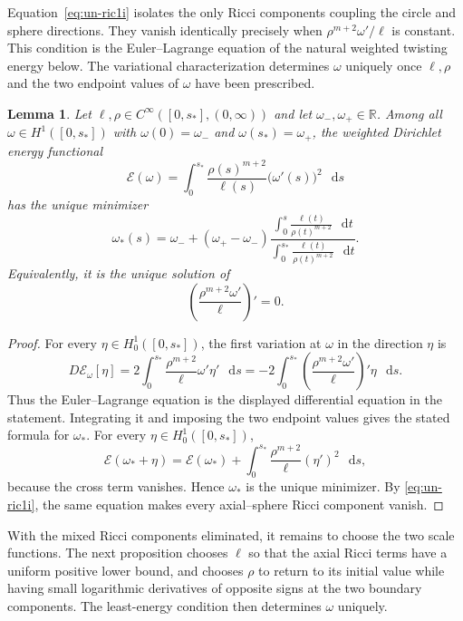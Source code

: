 \documentclass[11pt,reqno]{amsart}
\newtheorem{lemma}[theorem]{Lemma}
\theoremstyle{definition}
\numberwithin{equation}{section}
\newcommand{\dd}{\mathop{}\!\mathrm d}
\begin{document}
Equation~\eqref{eq:un-ric1i} isolates the only Ricci components coupling
the circle and sphere directions.  They vanish identically precisely
when \(\rho^{m+2}\omega'/\ell\) is constant.  This condition is the
Euler--Lagrange equation of the natural weighted twisting energy below.
The variational characterization determines \(\omega\) uniquely once
\(\ell,\rho\) and the two endpoint values of \(\omega\) have been
prescribed.

\begin{lemma}\label{lem:least-energy-twist}
Let $\ell,\rho\in C^\infty([0,s_*],(0,\infty))$ and let
$\omega_-,\omega_+\in\mathbb R$.  Among all
$\omega\in H^1([0,s_*])$ with $\omega(0)=\omega_-$ and
$\omega(s_*)=\omega_+$, the weighted Dirichlet energy functional
\begin{equation}\label{eq:weighted Dirichlet energy}
\mathcal E(\omega)=\int_0^{s_*}
 \frac{\rho(s)^{m+2}}{\ell(s)}\bigl(\omega'(s)\bigr)^2\,\dd s
\end{equation}
has the unique minimizer
\[
 \omega_*(s)=\omega_-+(\omega_+-\omega_-)
 \frac{\displaystyle\int_0^s
        \frac{\ell(t)}{\rho(t)^{m+2}}\,\dd t}
      {\displaystyle\int_0^{s_*}
        \frac{\ell(t)}{\rho(t)^{m+2}}\,\dd t}.
\]
Equivalently, it is the unique solution of
\[
 \left(\frac{\rho^{m+2}\omega'}{\ell}\right)'=0.
\]
\end{lemma}

\begin{proof}
For every $\eta\in H_0^1([0,s_*])$, the first variation at $\omega$ in
the direction $\eta$ is
\[
 D\mathcal E_\omega[\eta]
 =2\int_0^{s_*}\frac{\rho^{m+2}}\ell\omega'\eta'\,\dd s
 =-2\int_0^{s_*}
   \left(\frac{\rho^{m+2}\omega'}\ell\right)'\eta\,\dd s.
\]
Thus the Euler--Lagrange equation is the displayed differential
equation in the statement.  Integrating it and imposing the two
endpoint values gives the stated formula for $\omega_*$.  For every
$\eta\in H_0^1([0,s_*])$,
\[
 \mathcal E(\omega_*+\eta)
 =\mathcal E(\omega_*)+
  \int_0^{s_*}\frac{\rho^{m+2}}\ell(\eta')^2\,\dd s,
\]
because the cross term vanishes.  Hence $\omega_*$ is the unique
minimizer.  By \eqref{eq:un-ric1i}, the same equation makes every
axial--sphere Ricci component vanish.
\end{proof}

With the mixed Ricci components eliminated, it remains to choose the two
scale functions.  The next proposition chooses \(\ell\) so that the
axial Ricci terms have a uniform positive lower bound, and chooses
\(\rho\) to return to its initial value while having small logarithmic
derivatives of opposite signs at the two boundary components.  The
least-energy condition then determines \(\omega\) uniquely.
\end{document}
